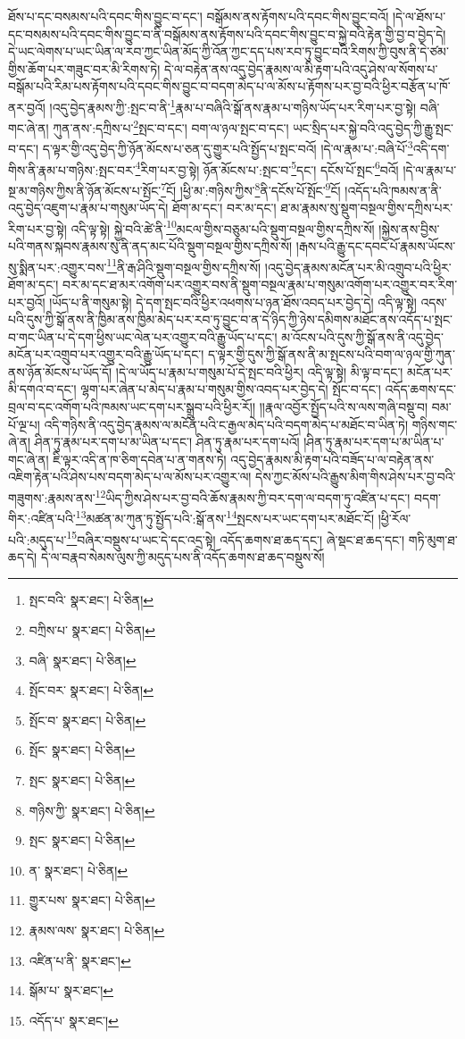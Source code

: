 ཐོས་པ་དང་བསམས་པའི་དབང་གིས་བྱུང་བ་དང་། བསྒོམས་ནས་རྟོགས་པའི་དབང་གིས་བྱུང་བའོ། །དེ་ལ་ཐོས་པ་དང་བསམས་པའི་དབང་གིས་བྱུང་བ་ནི་བསྒོམས་ནས་རྟོགས་པའི་དབང་གིས་བྱུང་བ་སྐྱེ་བའི་རྟེན་གྱི་བྱ་བ་བྱེད་དེ། དེ་ཡང་ལེགས་པ་ཡང་ཡིན་ལ་རབ་ཀྱང་ཡིན་མོད་ཀྱི་འོན་ཀྱང་དད་པས་རབ་ཏུ་བྱུང་བའི་རིགས་ཀྱི་བུས་ནི་དེ་ཙམ་གྱིས་ཆོག་པར་གཟུང་བར་མི་རིགས་ཏེ། དེ་ལ་བརྟེན་ནས་འདུ་བྱེད་རྣམས་ལ་མི་རྟག་པའི་འདུ་ཤེས་ལ་སོགས་པ་བསྒོམ་པའི་རིམ་པས་རྟོགས་པའི་དབང་གིས་བྱུང་བ་བདག་མེད་པ་ལ་མོས་པ་རྟོགས་པར་བྱ་བའི་ཕྱིར་བརྩོན་པ་ཁོ་ནར་བྱའོ། །འདུ་བྱེད་རྣམས་ཀྱི་:སྤང་བ་ནི་\footnote{སྤང་བའི་  སྣར་ཐང་།  པེ་ཅིན། }རྣམ་པ་བཞིའི་སྒོ་ནས་རྣམ་པ་གཉིས་ཡོད་པར་རིག་པར་བྱ་སྟེ། བཞི་གང་ཞེ་ན། ཀུན་ནས་:དཀྲིས་པ་\footnote{བཀྲིས་པ་  སྣར་ཐང་།  པེ་ཅིན། }སྤང་བ་དང་། བག་ལ་ཉལ་སྤང་བ་དང་། ཡང་སྲིད་པར་སྐྱེ་བའི་འདུ་བྱེད་ཀྱི་རྒྱུ་སྤང་བ་དང་། ད་ལྟར་གྱི་འདུ་བྱེད་ཀྱི་ཉོན་མོངས་པ་ཅན་དུ་གྱུར་པའི་སྤྱོད་པ་སྤང་བའོ། །དེ་ལ་རྣམ་པ་:བཞི་པོ་\footnote{བཞི་  སྣར་ཐང་།  པེ་ཅིན། }འདི་དག་གིས་ནི་རྣམ་པ་གཉིས་:སྤང་བར་\footnote{སྤོང་བར་  སྣར་ཐང་།  པེ་ཅིན། }རིག་པར་བྱ་སྟེ། ཉོན་མོངས་པ་:སྤང་བ་\footnote{སྤོང་བ་  སྣར་ཐང་།  པེ་ཅིན། }དང་། དངོས་པོ་སྤང་\footnote{སྤོང་  སྣར་ཐང་།  པེ་ཅིན། }བའོ། །དེ་ལ་རྣམ་པ་སྔ་མ་གཉིས་ཀྱིས་ནི་ཉོན་མོངས་པ་སྤོང་\footnote{སྤང་  སྣར་ཐང་།  པེ་ཅིན། }ངོ། །ཕྱི་མ་:གཉིས་ཀྱིས་\footnote{གཉིས་ཀྱི་  སྣར་ཐང་།  པེ་ཅིན། }ནི་དངོས་པོ་སྤོང་\footnote{སྤང་  སྣར་ཐང་།  པེ་ཅིན། }ངོ། །འདོད་པའི་ཁམས་ན་ནི་འདུ་བྱེད་འཇུག་པ་རྣམ་པ་གསུམ་ཡོད་དེ། ཐོག་མ་དང་། བར་མ་དང་། ཐ་མ་རྣམས་སུ་སྡུག་བསྔལ་གྱིས་དཀྲིས་པར་རིག་པར་བྱ་སྟེ། འདི་ལྟ་སྟེ། སྐྱེ་བའི་ཚེ་ནི་\footnote{ན་  སྣར་ཐང་།  པེ་ཅིན། }མངལ་གྱིས་བཅུམ་པའི་སྡུག་བསྔལ་གྱིས་དཀྲིས་སོ། །སྐྱེས་ནས་བྱིས་པའི་གནས་སྐབས་རྣམས་སུ་ནི་ནད་མང་པོའི་སྡུག་བསྔལ་གྱིས་དཀྲིས་སོ། །རྒས་པའི་རྒྱུ་དང་དབང་པོ་རྣམས་ཡོངས་སུ་སྨིན་པར་:འགྱུར་བས་\footnote{གྱུར་པས་  སྣར་ཐང་།  པེ་ཅིན། }ནི་རྒ་ཤིའི་སྡུག་བསྔལ་གྱིས་དཀྲིས་སོ། །འདུ་བྱེད་རྣམས་མངོན་པར་མི་འགྲུབ་པའི་ཕྱིར་ཐོག་མ་དང་། བར་མ་དང་ཐ་མར་འགོག་པར་འགྱུར་བས་ནི་སྡུག་བསྔལ་རྣམ་པ་གསུམ་འགོག་པར་འགྱུར་བར་རིག་པར་བྱའོ། །ཡོད་པ་ནི་གསུམ་སྟེ། དེ་དག་སྤང་བའི་ཕྱིར་འཕགས་པ་ཉན་ཐོས་འབད་པར་བྱེད་དེ། འདི་ལྟ་སྟེ། འདས་པའི་དུས་ཀྱི་སྒོ་ནས་ནི་ཁྱིམ་ནས་ཁྱིམ་མེད་པར་རབ་ཏུ་བྱུང་བ་ན་དེ་ཉིད་ཀྱི་ཉེས་དམིགས་མཐོང་ནས་འདོད་པ་སྤང་བ་གང་ཡིན་པ་དེ་དག་ཕྱིས་ཡང་ལེན་པར་འགྱུར་བའི་རྒྱུ་ཡོད་པ་དང་། མ་འོངས་པའི་དུས་ཀྱི་སྒོ་ནས་ནི་འདུ་བྱེད་མངོན་པར་འགྲུབ་པར་འགྱུར་བའི་རྒྱུ་ཡོད་པ་དང་། ད་ལྟར་གྱི་དུས་ཀྱི་སྒོ་ནས་ནི་མ་སྤངས་པའི་བག་ལ་ཉལ་གྱི་ཀུན་ནས་ཉོན་མོངས་པ་ཡོད་དོ། །དེ་ལ་ཡོད་པ་རྣམ་པ་གསུམ་པོ་དེ་སྤང་བའི་ཕྱིར། འདི་ལྟ་སྟེ། མི་ལྟ་བ་དང་། མངོན་པར་མི་དགའ་བ་དང་། ལྷག་པར་ཞེན་པ་མེད་པ་རྣམ་པ་གསུམ་གྱིས་འབད་པར་བྱེད་དེ། སྤོང་བ་དང་། འདོད་ཆགས་དང་བྲལ་བ་དང་འགོག་པའི་ཁམས་ཡང་དག་པར་སྒྲུབ་པའི་ཕྱིར་རོ།། །།རྣལ་འབྱོར་སྤྱོད་པའི་ས་ལས་གཞི་བསྡུ་བ། བམ་པོ་ལྔ་པ། འདི་གཉིས་ནི་འདུ་བྱེད་རྣམས་ལ་མངོན་པའི་ང་རྒྱལ་མེད་པའི་བདག་མེད་པ་མཐོང་བ་ཡིན་ཏེ། གཉིས་གང་ཞེ་ན། ཤིན་ཏུ་རྣམ་པར་དག་པ་མ་ཡིན་པ་དང་། ཤིན་ཏུ་རྣམ་པར་དག་པའོ། །ཤིན་ཏུ་རྣམ་པར་དག་པ་མ་ཡིན་པ་གང་ཞེ་ན། ཇི་ལྟར་འདི་ན་ཁ་ཅིག་དབེན་པ་ན་གནས་ཏེ། འདུ་བྱེད་རྣམས་མི་རྟག་པའི་བཟོད་པ་ལ་བརྟེན་ནས་འཇིག་རྟེན་པའི་ཤེས་པས་བདག་མེད་པ་ལ་མོས་པར་འགྱུར་ལ། དེས་ཀྱང་མོས་པའི་རྒྱུས་མིག་གིས་ཤེས་པར་བྱ་བའི་གཟུགས་:རྣམས་ནས་\footnote{རྣམས་ལས་  སྣར་ཐང་།  པེ་ཅིན། }ཡིད་ཀྱིས་ཤེས་པར་བྱ་བའི་ཆོས་རྣམས་ཀྱི་བར་དག་ལ་བདག་ཏུ་འཛིན་པ་དང་། བདག་གིར་:འཛིན་པའི་\footnote{འཛིན་པ་ནི་  སྣར་ཐང་། }མཚན་མ་ཀུན་ཏུ་སྤྱོད་པའི་:སྒོ་ནས་\footnote{སྒོམ་པ་  སྣར་ཐང་། }སྤངས་པར་ཡང་དག་པར་མཐོང་ངོ། །ཕྱི་རོལ་པའི་:མདུད་པ་\footnote{འདོད་པ་  སྣར་ཐང་། }བཞིར་བསྡུས་པ་ཡང་དེ་དང་འདྲ་སྟེ། འདོད་ཆགས་ཐ་ཆད་དང་། ཞེ་སྡང་ཐ་ཆད་དང་། གཏི་མུག་ཐ་ཆད་དེ། དེ་ལ་བརྣབ་སེམས་ལུས་ཀྱི་མདུད་པས་ནི་འདོད་ཆགས་ཐ་ཆད་བསྡུས་སོ། 